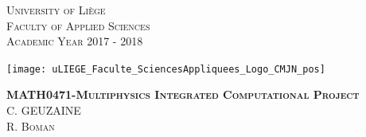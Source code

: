 \documentclass[12 pt]{article}
\begin{document}
\begin{titlepage}
    \vspace{-1cm}
    
    \begin{minipage}{0.6\textwidth}
        \begin{flushleft}
            \centering
            \textsc{University of Liège} \\
            \textsc{Faculty of Applied Sciences} \\
            \textsc{Academic Year 2017 - 2018}
        \end{flushleft}
    \end{minipage}

    \vspace{-2.6cm}
    \hspace{0.5\textwidth}
    
    \begin{minipage}[t]{1.1\textwidth}
        \begin{flushright}
            \texttt{[image: uLIEGE\_Faculte\_SciencesAppliquees\_Logo\_CMJN\_pos]}
        \end{flushright}
    \end{minipage}

    \vspace{1cm}


    \begin{minipage}{\textwidth}
        \hspace{-0.7cm}\noindent\makebox[\linewidth]{\rule{\textwidth}{2pt}} 
    \end{minipage}

    \vspace{1cm}

    \begin{minipage}{\textwidth}
        \begin{center}
           \hspace{-0.8cm}\Huge{\textsc{\textbf{MATH0471-Multiphysics Integrated Computational Project}}}\\
            \vspace{0.3cm}
            \hspace{-0.8cm}\textsc{C. GEUZAINE \\ R. Boman} \\
        \end{center}
    \end{minipage}

    \vspace{1cm}


\end{titlepage}
\end{document}
